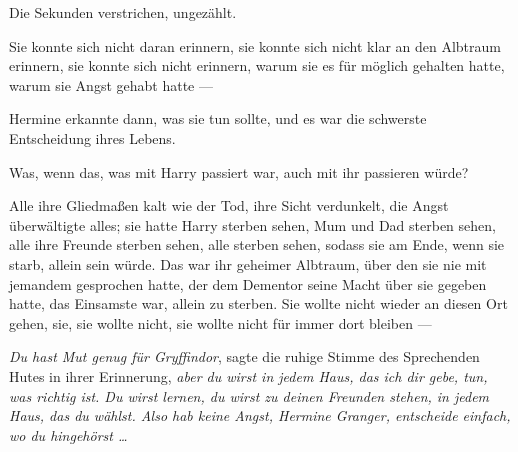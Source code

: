 Die Sekunden verstrichen, ungezählt.

Sie konnte sich nicht daran erinnern, sie konnte sich nicht klar an den Albtraum erinnern, sie konnte sich nicht erinnern, warum sie es für möglich gehalten hatte, warum sie Angst gehabt hatte —

Hermine erkannte dann, was sie tun sollte, und es war die schwerste Entscheidung ihres Lebens.

Was, wenn das, was mit Harry passiert war, auch mit ihr passieren würde?

Alle ihre Gliedmaßen kalt wie der Tod, ihre Sicht verdunkelt, die Angst überwältigte alles; sie hatte Harry sterben sehen, Mum und Dad sterben sehen, alle ihre Freunde sterben sehen, alle sterben sehen, sodass sie am Ende, wenn sie starb, allein sein würde. Das war ihr geheimer Albtraum, über den sie nie mit jemandem gesprochen hatte, der dem Dementor seine Macht über sie gegeben hatte, das Einsamste war, allein zu sterben.
Sie wollte nicht wieder an diesen Ort gehen, sie, sie wollte nicht, sie wollte nicht für immer dort bleiben —

\emph{Du hast Mut genug für Gryffindor}, sagte die ruhige Stimme des Sprechenden Hutes in ihrer Erinnerung, \emph{aber du wirst in jedem Haus, das ich dir gebe, tun, was richtig ist. Du wirst lernen, du wirst zu deinen Freunden stehen, in jedem Haus, das du wählst. Also hab keine Angst, Hermine Granger, entscheide einfach, wo du hingehörst …}

